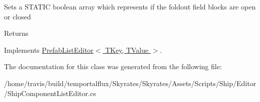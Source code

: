 Sets a S\-T\-A\-T\-I\-C boolean array which represents if the foldout field blocks are open or closed 

\begin{DoxyReturn}{Returns}

\end{DoxyReturn}


Implements \hyperlink{class_prefab_list_editor_3_01_t_key_00_01_t_value_01_4_a7854686cfcba09b2c55ace182e38eddf}{Prefab\-List\-Editor$<$ T\-Key, T\-Value $>$}.



The documentation for this class was generated from the following file\-:\begin{DoxyCompactItemize}
\item 
/home/travis/build/temportalflux/\-Skyrates/\-Skyrates/\-Assets/\-Scripts/\-Ship/\-Editor/Ship\-Component\-List\-Editor.\-cs\end{DoxyCompactItemize}
